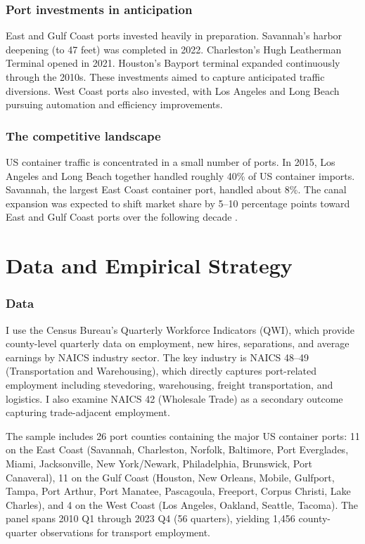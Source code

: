 \documentclass[12pt]{article}
\begin{document}
\subsubsection*{Port investments in anticipation} East and Gulf Coast ports invested heavily in preparation. Savannah's harbor deepening (to 47 feet) was completed in 2022. Charleston's Hugh Leatherman Terminal opened in 2021. Houston's Bayport terminal expanded continuously through the 2010s. These investments aimed to capture anticipated traffic diversions. West Coast ports also invested, with Los Angeles and Long Beach pursuing automation and efficiency improvements.

\subsubsection*{The competitive landscape} US container traffic is concentrated in a small number of ports. In 2015, Los Angeles and Long Beach together handled roughly 40\% of US container imports. Savannah, the largest East Coast container port, handled about 8\%. The canal expansion was expected to shift market share by 5--10 percentage points toward East and Gulf Coast ports over the following decade \citep{usace2012}.

\section{Data and Empirical Strategy}

\subsubsection*{Data} I use the Census Bureau's Quarterly Workforce Indicators (QWI), which provide county-level quarterly data on employment, new hires, separations, and average earnings by NAICS industry sector. The key industry is NAICS 48--49 (Transportation and Warehousing), which directly captures port-related employment including stevedoring, warehousing, freight transportation, and logistics. I also examine NAICS 42 (Wholesale Trade) as a secondary outcome capturing trade-adjacent employment.

The sample includes 26 port counties containing the major US container ports: 11 on the East Coast (Savannah, Charleston, Norfolk, Baltimore, Port Everglades, Miami, Jacksonville, New York/Newark, Philadelphia, Brunswick, Port Canaveral), 11 on the Gulf Coast (Houston, New Orleans, Mobile, Gulfport, Tampa, Port Arthur, Port Manatee, Pascagoula, Freeport, Corpus Christi, Lake Charles), and 4 on the West Coast (Los Angeles, Oakland, Seattle, Tacoma). The panel spans 2010 Q1 through 2023 Q4 (56 quarters), yielding 1,456 county-quarter observations for transport employment.
\end{document}
